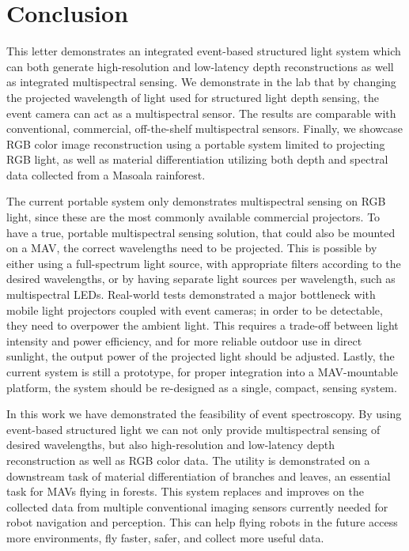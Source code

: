\section{Conclusion}

This letter demonstrates an integrated event-based structured light system which can both generate high-resolution and low-latency depth reconstructions as well as integrated multispectral sensing. We demonstrate in the lab that by changing the projected wavelength of light used for structured light depth sensing, the event camera can act as a multispectral sensor. The results are comparable with conventional, commercial, off-the-shelf multispectral sensors. Finally, we showcase RGB color image reconstruction using a portable system limited to projecting RGB light, as well as material differentiation utilizing both depth and spectral data collected from a Masoala rainforest.

The current portable system only demonstrates multispectral sensing on RGB light, since these are the most commonly available commercial projectors. To have a true, portable multispectral sensing solution, that could also be mounted on a MAV, the correct wavelengths need to be projected. This is possible by either using a full-spectrum light source, with appropriate filters according to the desired wavelengths, or by having separate light sources per wavelength, such as multispectral LEDs. 
Real-world tests demonstrated a major bottleneck with mobile light projectors coupled with event cameras; in order to be detectable, they need to overpower the ambient light. This requires a trade-off between light intensity and power efficiency, and for more reliable outdoor use in direct sunlight, the output power of the projected light should be adjusted. Lastly, the current system is still a prototype, for proper integration into a MAV-mountable platform, the system should be re-designed as a single, compact, sensing system.

In this work we have demonstrated the feasibility of event spectroscopy. By using event-based structured light we can not only provide multispectral sensing of desired wavelengths, but also high-resolution and low-latency depth reconstruction as well as RGB color data. The utility is demonstrated on a downstream task of material differentiation of branches and leaves, an essential task for MAVs flying in forests. This system replaces and improves on the collected data from  multiple conventional imaging sensors currently needed for robot navigation and perception. This can help flying robots in the future access more environments, fly faster, safer, and collect more useful data. 